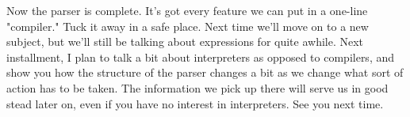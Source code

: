 \documentclass[float=false, crop=false]{standalone}
\begin{document}
Now the parser is complete. It's got every feature we can put in a one-line
"compiler." Tuck it away in a safe place. Next time we'll move on to a new
subject, but we'll still be talking about expressions for quite awhile. Next
installment, I plan to talk a bit about interpreters as opposed to compilers,
and show you how the structure of the parser changes a bit as we change what
sort of action has to be taken. The information we pick up there will serve us
in good stead later on, even if you have no interest in interpreters. See you
next time.
\end{document}
